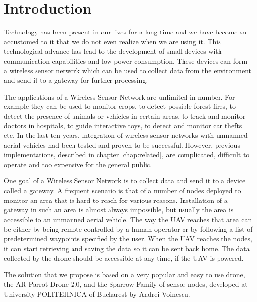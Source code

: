 \normalfont\normalsize
\chapter{Introduction}

Technology has been present in our lives for a long time and we have become so accustomed to it that we do not even realize when we are using it. This technological advance has lead to the development of small devices with communication capabilities and low power consumption. These devices can form a wireless sensor network which can be used to collect data from the environment and send it to a gateway for further processing.

The applications of a Wireless Sensor Network are unlimited in number. For example they can be used to monitor crops, to detect possible forest fires, to detect the presence of animals or vehicles in certain areas, to track and monitor doctors in hospitals, to guide interactive toys, to detect and monitor car thefts etc. In the last ten years, integration of wireless sensor networks with unmanned aerial vehicles had been tested and proven to be successful. However, previous implementations, described in chapter \ref{chap:related}, are complicated, difficult to operate and too expensive for the general public.

One goal of a Wireless Sensor Network is to collect data and send it to a device called a gateway. A frequent scenario is that of a number of nodes deployed to monitor an area that is hard to reach for various reasons. Installation of a gateway in such an area is almost always impossible, but usually the area is accessible to an unmanned aerial vehicle. The way the UAV reaches that area can be either by being remote-controlled by a human operator or by following a list of predetermined waypoints specified by the user. When the UAV reaches the nodes, it can start retrieving and saving the data so it can be sent back home. The data collected by the drone should be accessible at any time, if the UAV is powered.
 
The solution that we propose is based on a very popular and easy to use drone, the AR Parrot Drone 2.0, and the Sparrow Family \cite{voinescu2013lightweight} of sensor nodes, developed at University POLITEHNICA of Bucharest by Andrei Voinescu.
